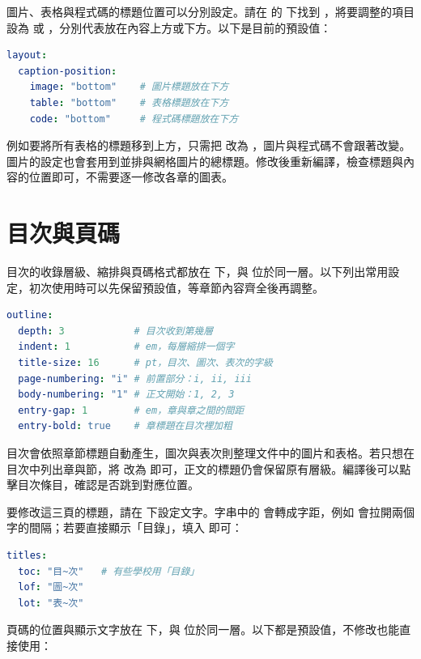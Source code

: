 圖片、表格與程式碼的標題位置可以分別設定。請在  的  下找到 ，將要調整的項目設為  或 ，分別代表放在內容上方或下方。以下是目前的預設值：

\begin{lstlisting}[language=yaml]
layout:
  caption-position:
    image: "bottom"    # 圖片標題放在下方
    table: "bottom"    # 表格標題放在下方
    code: "bottom"     # 程式碼標題放在下方
\end{lstlisting}

例如要將所有表格的標題移到上方，只需把  改為 ，圖片與程式碼不會跟著改變。圖片的設定也會套用到並排與網格圖片的總標題。修改後重新編譯，檢查標題與內容的位置即可，不需要逐一修改各章的圖表。

\section{目次與頁碼}

目次的收錄層級、縮排與頁碼格式都放在  下，與  位於同一層。以下列出常用設定，初次使用時可以先保留預設值，等章節內容齊全後再調整。

\begin{lstlisting}[language=yaml]
outline:
  depth: 3            # 目次收到第幾層
  indent: 1           # em，每層縮排一個字
  title-size: 16      # pt，目次、圖次、表次的字級
  page-numbering: "i" # 前置部分：i, ii, iii
  body-numbering: "1" # 正文開始：1, 2, 3
  entry-gap: 1        # em，章與章之間的間距
  entry-bold: true    # 章標題在目次裡加粗
\end{lstlisting}

目次會依照章節標題自動產生，圖次與表次則整理文件中的圖片和表格。若只想在目次中列出章與節，將  改為  即可，正文的標題仍會保留原有層級。編譯後可以點擊目次條目，確認是否跳到對應位置。

要修改這三頁的標題，請在  下設定文字。字串中的 \code{~} 會轉成字距，例如  會拉開兩個字的間隔；若要直接顯示「目錄」，填入  即可：

\begin{lstlisting}[language=yaml]
titles:
  toc: "目~次"   # 有些學校用「目錄」
  lof: "圖~次"
  lot: "表~次"
\end{lstlisting}

頁碼的位置與顯示文字放在  下，與  位於同一層。以下都是預設值，不修改也能直接使用：

